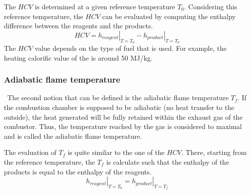The $HCV$ is determined at a given reference temperature $T_0$. Considering this reference temperature, the $HCV$ can be evaluated by computing the enthalpy difference between the reagents and the products. 
\begin{equation}
HCV = \left.h_{reagent}\right|_{T=T_0} - \left.h_{product}\right|_{T=T_0}\label{eq:C3_HCV2}
\end{equation}
The $HCV$ value depends on the type of fuel that is used. For example, the heating calorific value of the  is around 50 MJ/kg.

\subsubsection{Adiabatic flame temperature}
\quad\, The second notion that can be defined is the adiabatic flame temperature $T_f$. If the combustion chamber is supposed to be adiabatic (no heat transfer to the outside), the heat generated will be fully retained within the exhaust gas of the combustor. Thus, the temperature reached by the gas is considered to maximal and is called the adiabatic flame temperature.

The evaluation of $T_f$ is quite similar to the one of the $HCV$. There, starting from the reference temperature, the $T_f$ is calculate such that the enthalpy of the products is equal to the enthalpy of the reagents.
\begin{equation}
\left.h_{reagent}\right|_{T=T_0} = \left.h_{product}\right|_{T=T_f}\label{eq:C3_T_f}
\end{equation}
\newpage
